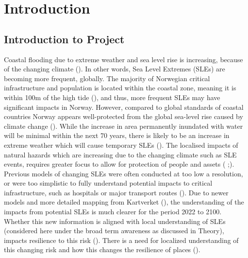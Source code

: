 




\chapter{Introduction}
\section{Introduction to Project}
Coastal flooding due to extreme weather and sea level rise is increasing, because of the changing climate (\cite{hoffken_effects_2020}).  In other words, Sea Level Extremes (SLEs) are becoming more frequent, globally. The majority of Norwegian critical infrastructure and population is located within the coastal zone, meaning it is within 100m of the high tide (\cite{engebakken_construction_2022}), and thus, more frequent SLEs may have significant impacts in Norway. However, compared to global standards of coastal countries Norway appears well-protected from the global sea-level rise caused by climate change (\cite{aunan_strong_2008}). While the increase in area permanently inundated with water will be minimal within the next 70 years, there is likely to be an increase in extreme weather which will cause temporary SLEs (\cite{aunan_strong_2008}). The localised impacts of natural hazards which are increasing due to the changing climate such as SLE events, requires greater focus to allow for protection of people and assets (\cite{lujala_quantifying_2014} ;\cite{aunan_strong_2008}). Previous models of changing SLEs were often conducted at too low a resolution, or were too simplistic to fully understand potential impacts to critical infrastructure, such as hospitals or major transport routes (\cite{hoffken_effects_2020}). Due to newer models and more detailed mapping from Kartverket (\cite{kartverket_se_2021}), the understanding of the impacts from potential SLEs is much clearer for the period 2022 to 2100. Whether this new information is aligned with local understanding of SLEs (considered here under the broad term awareness as discussed in Theory), impacts resilience to this risk (\cite{setten_we_2019}).  There is a need for localized understanding of this changing risk and how this changes the resilience of places (\cite{rod_integrated_2012}).
